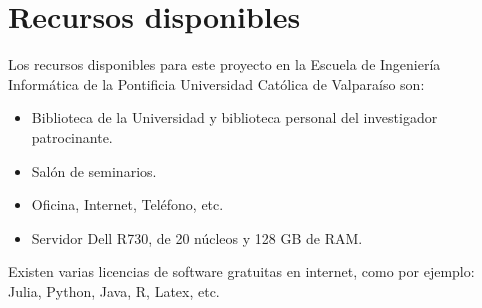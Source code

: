 \documentclass[10pt]{article}
\begin{document}
\section{Recursos disponibles}
Los recursos disponibles para este proyecto en la Escuela de Ingeniería Informática de la Pontificia Universidad Católica de Valparaíso son:

\begin{itemize}
\item Biblioteca de la Universidad y biblioteca personal del investigador patrocinante.
\item Salón de seminarios.
\item Oficina, Internet, Teléfono, etc.
\item Servidor Dell R730, de 20 núcleos y 128 GB de RAM.
\end{itemize}

Existen varias licencias de software gratuitas en internet, como por ejemplo: Julia, Python, Java, R, Latex, etc. 
\end{document}
